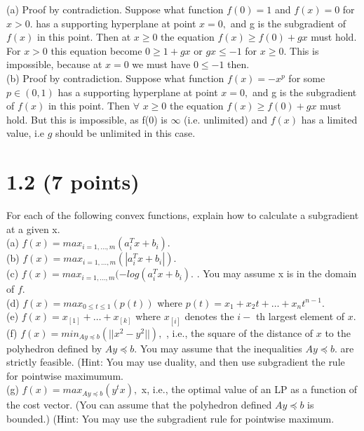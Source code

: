 \documentclass{article}
\begin{document}
(a) Proof by contradiction. 
Suppose what function 
$f(0) = 1$ and $f(x) = 0$ for $x > 0.$ has a supporting hyperplane at point $x = 0,$ and g is the subgradient of $f(x)$ in this point. Then at $x \geq 0$ the equation
$f(x) \geq f(0) + g x$ must hold. For $x > 0$ this equation become $0 \geq 1 + g x $ or $gx \leq - 1$ for $x \geq 0.$ This is impossible, because at $x = 0$ we must have $0 \leq -1 $ then. \\

(b) Proof by contradiction.
Suppose what function $f(x) = -x^p$ for some $p \in (0, 1)$ has a supporting hyperplane at point $x = 0,$ and g is the subgradient of $f(x)$ in this point. Then $\forall$ $x \geq 0$ the equation $f(x) \geq f(0) + g x$ must hold. But this is impossible, as f(0) is $\infty$ (i.e.  unlimited) and $f(x)$ has a limited value, i.e $g$ should be unlimited in this case.\\

\section*{1.2 (7 points)}
 For each of the following convex functions, explain how to calculate a subgradient at a given x.\\
 
 (a) $f(x) = max_{i = 1, \dots, m}(a_i^T x + b_i).$\\
 
 (b) $f(x) = max_{i = 1, \dots, m}(|a_i^T x + b_i|).$\\
 
 (c) $f(x) = max_{i = 1, \dots, m}(- 
 log(a_i^T x + b_i).$ . You may assume x is in the domain of $f.$\\
 
 (d) $f(x) = max_{0 \leq t \leq 1}(p(t))$ where 
 $p(t) = x_1 + x_2 t + \dots + x_n t^{n - 1}.$\\
 
 (e) $f(x) = x_{[1]} + \dots + x_{[k]}$ where $x_{[i]}$ 
 denotes the $i-$ th largest element of $x.$ \\
 
 (f) $f(x) = min_{Ay \preceq b}(||x^2 - y^2||),$ 
 , i.e., the square of the distance of $x$ to the polyhedron defined by $Ay \preceq b.$ You may assume that the inequalities $Ay \preceq b.$ are strictly feasible. (Hint: You may use duality, and then use subgradient the rule for pointwise maximumum.  \\
 
 (g) $f(x) = max_{Ay \preceq b}(y^t x),$  x, i.e., the optimal value of an LP as a function of the cost
 vector. (You can assume that the polyhedron defined 
 $Ay \preceq b$ is bounded.)
 (Hint: You may use the subgradient rule for pointwise maximum.\\
 
\end{document}
